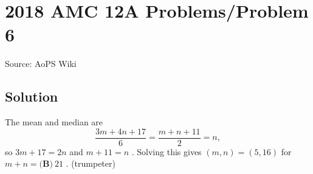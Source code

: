 \documentclass[12pt]{article}
\begin{document}
\section*{{2018 AMC 12A Problems/Problem 6}}
Source: AoPS Wiki

\subsection*{Solution}
The mean and median are \[\frac{3m+4n+17}{6}=\frac{m+n+11}{2}=n,\] so $3m+17=2n$ and $m+11=n$ . Solving this gives $\left(m,n\right)=\left(5,16\right)$ for $m+n=\boxed{\textbf{(B)}~21}$ . (trumpeter)
\end{document}
